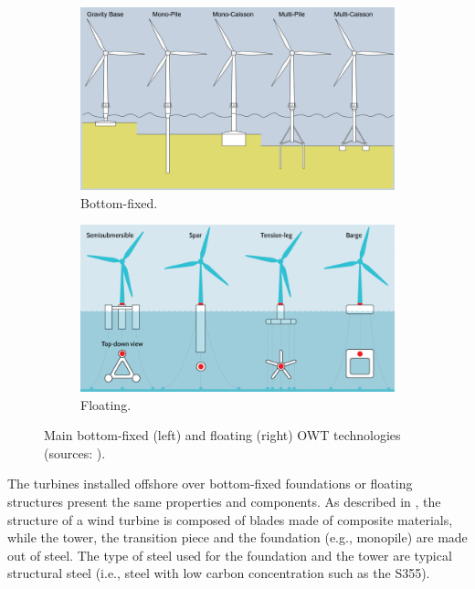 \begin{figure}
    \begin{subfigure}[b]{0.48\textwidth}
        \centering
        \includegraphics[width=\linewidth]{./part1/figures/bottom_fixed_techno.png}
        \caption{Bottom-fixed.}
        \label{fig:FOWT_bottomfixed}
    \end{subfigure}
    \begin{subfigure}[b]{0.48\textwidth}
        \centering
        \includegraphics[width=\linewidth]{./part1/figures/Floating-wind-platform-categories.png}
        \caption{Floating.}
        \label{fig:FOWT_floating}
    \end{subfigure}
    \caption{Main bottom-fixed (left) and floating (right) OWT technologies (sources: \citealp{ahmed_2015_bottomfixed_image,mei_2021_FOWT_illustration}).}
\end{figure}

The turbines installed offshore over bottom-fixed foundations or floating structures present the same properties and components. 
As described in , the structure of a wind turbine is composed of blades made of composite materials, while the tower, the transition piece and the foundation (e.g., monopile) are made out of steel. 
The type of steel used for the foundation and the tower are typical structural steel (i.e., steel with low carbon concentration such as the S355). 

